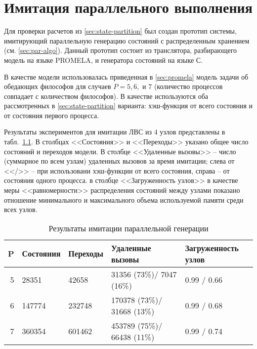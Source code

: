 \chapter{Имитация параллельного выполнения}
\label{cha:paremu}

Для проверки расчетов из \ref{sec:state-partition} был создан прототип
системы, имитирующий параллельную генерацию состояний с распределенным
хранением (см. \ref{sec:par-algo}). Данный прототип состоит из
транслятора, разбирающего модель на языке PROMELA, и генератора
состояний на языке С.

В качестве модели использовалась приведенная в \ref{sec:promela}
модель задачи об обедающих философов для случаев $P = 5, 6, \text{ и }
7$ (количество процессов совпадает с количеством философов). В
качестве  используются оба рассмотренных в
\ref{sec:state-partition} варианта: хэш-функция от всего состояния и
от состояния первого процесса. 

Результаты экспериментов для имитации ЛВС из 4 узлов представлены в
табл.~\ref{tab:paremu-stats}. В столбцах <<Состояния>> и <<Переходы>> указано
общее число состояний и переходов модели. В столбце <<Удаленные вызовы>> --
число (суммарное по всем узлам) удаленных вызовов за время имитации; слева от
<</>> -- при использовани хэш-функции от всего состояния, справа -- от состояния
одного процесса. в столбце <<Загруженность узлов>> в качестве меры
<<равномерности>> распределения состояний между узлами показано отношение
минимального и максимального объема используемой памяти среди всех узлов.

\begin{table}[ht]
  \centering
  \begin{tabular}[ht]{|r|l|l|l|p{}|}
    \hline
    P & Состояния & Переходы & Удаленные вызовы & Загруженность узлов    \\
    \hline
    5 & 28351     & 42658    & 31356  (73\%)/ 7047  (16\%) & 0.99 / 0.66 \\ 
    6 & 147774    & 232748   & 170378 (73\%)/ 31668 (13\%) & 0.99 / 0.68 \\ 
    7 & 360354    & 601462   & 453789 (75\%)/ 66438 (11\%) & 0.99 / 0.74 \\ 
    \hline
  \end{tabular}
  \caption{Результаты имитации параллельной генерации}
  \label{tab:paremu-stats}
\end{table}


